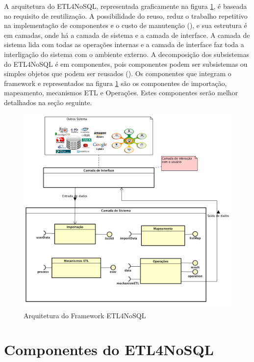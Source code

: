 A arquitetura do ETL4NoSQL, representada graficamente na figura \ref{arquitetura}, é baseada no requisito de reutilização. A possibilidade do reuso, reduz o trabalho repetitivo na implementação de componentes e o custo de manutenção (\cite{aoyama:2002}), e sua estrutura é em camadas, onde há a camada de sistema e a camada de interface. A camada de sistema lida com todas as operações internas e a camada de interface faz toda a interligação do sistema com o ambiente externo. A decomposição dos subsistemas do ETL4NoSQL é em componentes, pois componentes podem ser subsistemas ou simples objetos que podem ser reusados (\cite{sommerville:2013}). Os componentes que integram o framework e representados na figura \ref{arquitetura} são os componentes de importação, mapeamento, mecanismos ETL e Operações. Estes componentes serão melhor detalhados na seção seguinte.


\begin{figure}[h]
	\centering
	\includegraphics[scale=0.5]{fig/arquitetura_camadas.png}
	\caption{Arquitetura do Framework ETL4NoSQL}
	\label{arquitetura}
\end{figure}

\section{Componentes do ETL4NoSQL}

